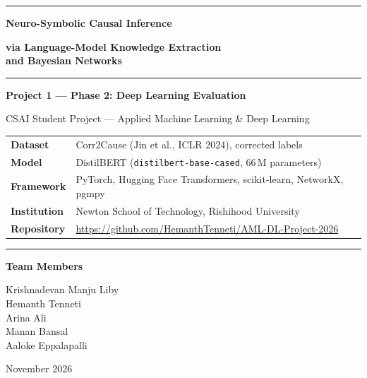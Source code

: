 \documentclass[12pt,a4paper]{article}
\newcommand{\MemberA}{Krishnadevan Manju Liby}
\newcommand{\MemberB}{Hemanth Tenneti}
\newcommand{\MemberC}{Arina Ali}
\newcommand{\MemberD}{Manan Bansal}
\newcommand{\MemberE}{Aaloke Eppalapalli}
\newcommand{\Institution}{Newton School of Technology, Rishihood University}
\newcommand{\Course}{CSAI Student Project --- Applied Machine Learning \& Deep Learning}
\newcommand{\RepoURL}{https://github.com/HemanthTenneti/AML-DL-Project-2026}
\newcommand{\ReportDate}{November 2026}
\begin{document}
\begin{titlepage}
\centering
\vspace*{2.2cm}
{\color{navy}\rule{\linewidth}{0.8pt}}\par\vspace{1.0cm}
{\Huge\bfseries\color{navy} Neuro-Symbolic Causal Inference\par}
\vspace{0.4cm}
{\Large\bfseries\color{navy} via Language-Model Knowledge Extraction\\[0.15em] and Bayesian Networks\par}
\vspace{0.9cm}
{\color{navy}\rule{\linewidth}{0.8pt}}\par\vspace{1.1cm}
{\large\bfseries\color{accent} Project 1 --- Phase 2: Deep Learning Evaluation\par}
\vspace{0.6cm}
{\large \Course\par}
\vspace{1.2cm}
\begin{tabular}{@{}>{\bfseries}l l@{}}
Dataset     & Corr2Cause (Jin et al., ICLR 2024), corrected labels \\
Model       & DistilBERT (\texttt{distilbert-base-cased}, 66\,M parameters) \\
Framework   & PyTorch, Hugging Face Transformers, scikit-learn, NetworkX, pgmpy \\
Institution & \Institution \\
Repository  & \small\url{\RepoURL} \\
\end{tabular}
\par\vspace{1.4cm}
{\color{navy}\rule{0.6\linewidth}{0.6pt}}\par\vspace{0.6cm}
{\large\bfseries Team Members\par}\vspace{0.2cm}
{\large \MemberA\\ \MemberB\\ \MemberC\\ \MemberD\\ \MemberE\par}
\vfill
{\large \ReportDate\par}
\end{titlepage}
\end{document}
